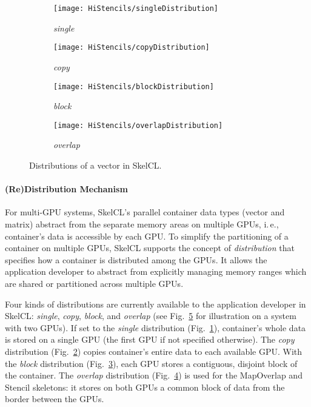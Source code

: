 \begin{figure}[tb]
  \centering
  \begin{subfigure}{.22\textwidth}
    \texttt{[image: HiStencils/singleDistribution]}
    \caption{\emph{single}}
    \label{fig:distributions:single}
  \end{subfigure}
  \hfill
  \begin{subfigure}{.22\textwidth}
    \texttt{[image: HiStencils/copyDistribution]}
    \caption{\emph{copy}}
    \label{fig:distributions:copy}
  \end{subfigure}
  \hfill
  \begin{subfigure}{.22\textwidth}
    \texttt{[image: HiStencils/blockDistribution]}
    \caption{\emph{block}}
    \label{fig:distributions:block}
  \end{subfigure}
  \hfill
  \begin{subfigure}{.22\textwidth}
    \texttt{[image: HiStencils/overlapDistribution]}
    \caption{\emph{overlap}}
    \label{fig:distributions:overlap}
  \end{subfigure}
  \caption{Distributions of a vector in SkelCL.}
  \label{fig:distributions}
  \bigskip
\end{figure}

\paragraph{(Re)Distribution Mechanism}
For multi-GPU systems, SkelCL's parallel container data types (vector and matrix) abstract from the separate memory areas on multiple GPUs, i.\,e., container's data is accessible by each GPU.
To simplify the partitioning of a container on multiple GPUs, SkelCL supports the concept of \emph{distribution} that specifies how a container is distributed among the GPUs.
It allows the application developer to abstract from explicitly managing memory ranges which are shared or partitioned across multiple GPUs.

Four kinds of distributions are currently available to the application developer in SkelCL:
\emph{single}, \emph{copy}, \emph{block}, and \emph{overlap} (see Fig.~\ref{fig:distributions} for illustration on a system with two GPUs).
If set to the \emph{single} distribution (Fig.~\ref{fig:distributions:single}), container's whole data is stored on a single GPU (the first GPU if not specified otherwise).
The \emph{copy} distribution (Fig.~\ref{fig:distributions:copy}) copies container's entire data to each available GPU.
With the \emph{block} distribution (Fig.~\ref{fig:distributions:block}), each GPU stores a contiguous, disjoint block of the container.
The \emph{overlap} distribution (Fig.~\ref{fig:distributions:overlap}) is used for the MapOverlap and Stencil skeletons:
it stores on both GPUs a common block of data from the border between the GPUs.


